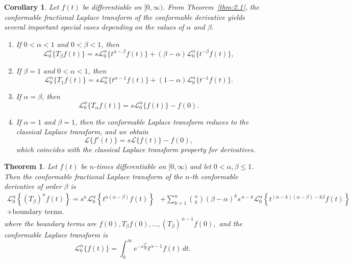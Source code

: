 \documentclass[two side,reqno,12pt]{amsart}
\numberwithin{equation}{section}
\newtheorem{theorem}[lemma]{Theorem}
\newtheorem{corollary}[lemma]{Corollary}
\theoremstyle{definition}
\begin{document}
\begin{corollary}
Let $f(t)$ be differentiable on $[0,\infty)$. From Theorem~\ref{thm:2.1}, the conformable fractional Laplace transform of the conformable derivative yields several important special cases depending on the values of $\alpha$ and $\beta$.
\begin{enumerate}
\item If $0<\alpha<1$ and $0<\beta<1$, then
\[
\mathcal{L}_0^{\alpha}\{T_{\beta}f(t)\}
= s\mathcal{L}_0^{\alpha}\{t^{\alpha-\beta}f(t)\}
+(\beta-\alpha)\mathcal{L}_0^{\alpha}\{t^{-\beta}f(t)\},
\]
\item If $\beta=1$ and $0<\alpha<1$, then
\[
\mathcal{L}_0^{\alpha}\{T_{1}f(t)\}
= s\mathcal{L}_0^{\alpha}\{t^{\alpha-1}f(t)\}
+(1-\alpha)\mathcal{L}_0^{\alpha}\{t^{-1}f(t)\}.
\]
\item If $\alpha=\beta$, then
\[
\mathcal{L}_0^{\alpha}\{T_{\alpha}f(t)\}
= s\mathcal{L}_0^{\alpha}\{f(t)\}-f(0).
\]
\item If $\alpha=1$ and $\beta=1$, then the conformable Laplace transform reduces to the classical Laplace transform, and we obtain
\[
\mathcal{L}\{f'(t)\}=s\mathcal{L}\{f(t)\}-f(0),
\]
which coincides with the classical Laplace transform property for derivatives.
\end{enumerate}
\end{corollary}
\begin{theorem}
Let $f(t)$ be $n$-times differentiable on $[0,\infty)$ and let $0<\alpha,\beta\leq 1$. Then the conformable fractional Laplace transform of the $n$-th conformable derivative of order $\beta$ is
\begin{align*}
\mathcal{L}_0^{\alpha} \left\{ (T_\beta)^n f(t) \right\} = s^n \mathcal{L}_0^{\alpha} \left\{ t^{n(\alpha-\beta)} f(t) \right\} 
&+ \sum_{k=1}^n \binom{n}{k} (\beta-\alpha)^k s^{\,n-k} \mathcal{L}_0^{\alpha} \left\{ t^{(n-k)(\alpha-\beta)-k\beta} f(t) \right\} \\
+ \text{boundary terms}.
\end{align*}
where the boundary terms are
$
f(0), T_\beta f(0), \ldots, (T_\beta)^{\,n-1} f(0),
$ and the conformable Laplace transform is
\[
\mathcal{L}_0^{\alpha} \{ f(t) \} = \int_0^\infty e^{-s \frac{t^\alpha}{\alpha}} t^{\alpha-1} f(t) \, dt.
\]
\end{theorem}
\end{document}

